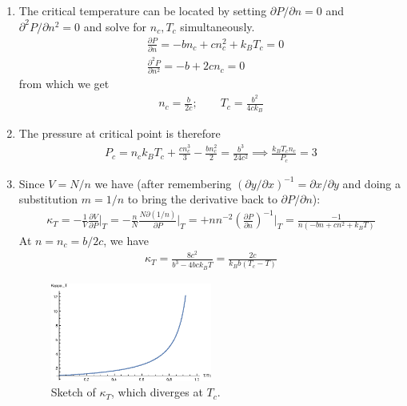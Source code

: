 \documentclass{article}
\theoremstyle{definition}
\newcommand{\p}{\partial}
\newcommand{\f}[2]{\frac{#1}{#2}}
\newcommand{\lp}{\left(}
\newcommand{\rp}{\right)}
\begin{document}
\begin{enumerate}[label=(\alph*)]
	
	\item The critical temperature can be located by setting $\p P / \p n = 0$ and $\p^2 P /\p n^2 = 0$ and solve for $n_c, T_c$ simultaneously. 
	\begin{align*}
	&\f{\p P}{\p n} = -bn_c + cn_c^2 + k_BT_c = 0 \\
	&\f{\p^2 P}{\p n^2} = -b + 2cn_c = 0
	\end{align*}
	from which we get
	\begin{align*}
	\boxed{n_c = \f{b}{2c}; \quad\quad T_c = \f{b^2}{4ck_B}}
	\end{align*}
	\item 
	The pressure at critical point is therefore
	\begin{align*}
	P_c = n_ck_BT_c + \f{cn_c^3}{3} - \f{b n_c^2}{2} = \boxed{\f{b^3}{24c^2}} \implies \boxed{\f{k_B T_c n_c}{P_c} = 3 }
	\end{align*}
	\item Since $V = N/n$ we have (after remembering $(\p y/\p x)^{-1} = \p x/\p y$ and doing a substitution $m =1/n$ to bring the derivative back to $\p P / \p n$):
	\begin{align*}
	\kappa_T = -\f{1}{V}\f{\p V}{\p P}\bigg\vert_T = -\f{n}{N}\f{N\p (1/n)}{\p P}\bigg\vert_T = +n n^{-2}\lp \f{\p P}{\p n}\rp^{-1}\bigg\vert_T = \boxed{\f{-1}{n(-bn + cn^2 + k_BT)}}
	\end{align*}
	At $n = n_c = b/2c$, we have
	\begin{align*}
	\kappa_T = \f{8c^2}{b^3 - 4bc k_B T} = \boxed{\f{2c}{k_Bb(T_c-T)}}
	\end{align*} 
	\begin{figure}[!htb]
		\centering
		\includegraphics[width=0.5\textwidth]{sketch}
		\caption{Sketch of $\kappa_T$, which diverges at $T_c$.}
	\end{figure}



\end{enumerate}
\end{document}
